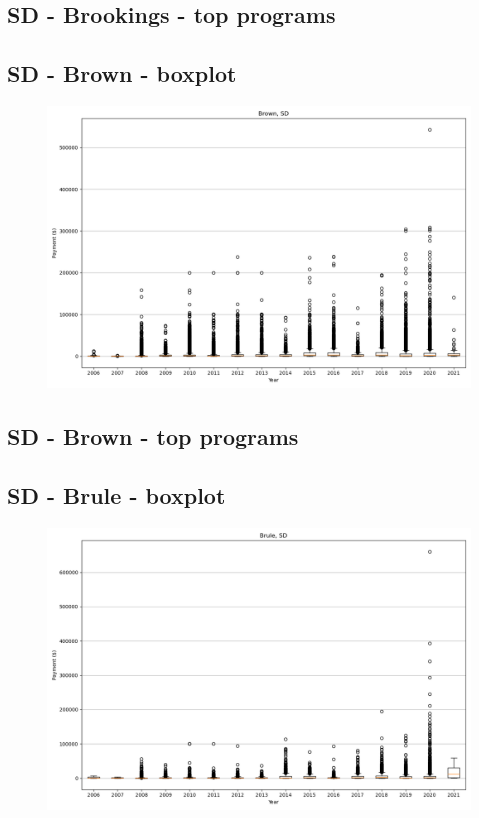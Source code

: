 \subsection*{SD - Brookings - top programs}

\newpage
\subsection*{SD - Brown - boxplot}
\begin{figure}[h]
\centering
\includegraphics[width=7in]{../output/boxplots/counties/Brown-SD_boxplot.png}
\end{figure}


\subsection*{SD - Brown - top programs}

\newpage
\subsection*{SD - Brule - boxplot}
\begin{figure}[h]
\centering
\includegraphics[width=7in]{../output/boxplots/counties/Brule-SD_boxplot.png}
\end{figure}



